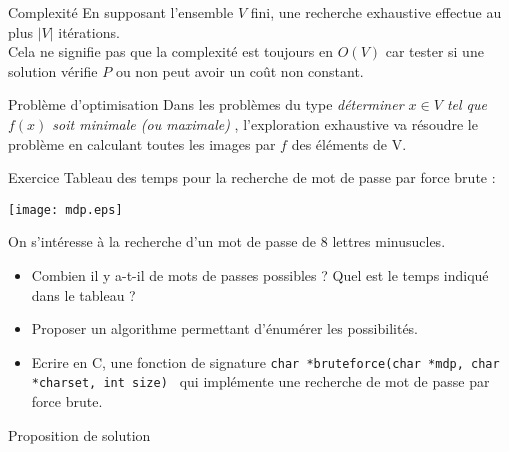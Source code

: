 \documentclass[10pt]{beamer}
\begin{document}
\begin{frame}[fragile]{\Ctitle}{\stitle}
	\begin{block}{Complexité}
		En supposant l'ensemble $V$ fini, une recherche exhaustive effectue au plus $|V|$ itérations.\\
		\textcolor{BrickRed}{\small \danger} Cela ne signifie pas que la complexité est toujours en $O(V)$ car tester si une solution vérifie $P$ ou non peut avoir un coût non constant.
	\end{block}
	\begin{block}{Problème d'optimisation}
		Dans les problèmes du type \og{} \textit{déterminer $x \in V$ tel que $f(x)$ soit minimale (ou maximale)} \fg{}, l'exploration exhaustive va résoudre le problème en calculant toutes les images par $f$ des éléments de V.
	\end{block}
\end{frame}

\begin{frame}[fragile]{\Ctitle}{\stitle}
	\begin{exampleblock}{Exercice}
		Tableau des temps pour la recherche de mot de passe par force brute :
		\begin{center}
			\texttt{[image: mdp.eps]}
		\end{center}
		On s'intéresse à la recherche d'un mot de passe de 8 lettres minusucles.
		\begin{itemize}
			\item<2-> Combien il y a-t-il de mots de passes possibles ? Quel est le temps indiqué dans le tableau ?
			\item<3-> Proposer un algorithme permettant d'énumérer les possibilités.
			\item<4-> Ecrire en C, une fonction de signature \texttt{char *bruteforce(char *mdp, char *charset, int size)
				} qui implémente une recherche de mot de passe par force brute.
		\end{itemize}
	\end{exampleblock}
\end{frame}

\begin{frame}[fragile]{\Ctitle}{\stitle}
	\begin{exampleblock}{Proposition de solution}
	\end{exampleblock}
\end{frame}
\end{document}
